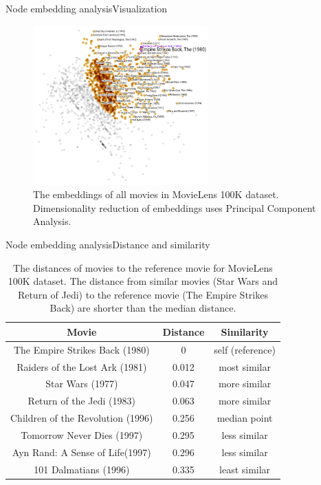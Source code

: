 \documentclass{beamer}
\begin{document}
\begin{frame}{Node embedding analysis}{Visualization}
	\begin{figure}[!ht]\centering
		\includegraphics[width=0.6\textwidth]{movies-annotation}
		\caption{
			The embeddings of all movies in MovieLens 100K dataset. Dimensionality reduction of embeddings uses Principal Component Analysis.
		}
		\label{fig:movies}
	\end{figure}
\end{frame}

\begin{frame}{Node embedding analysis}{Distance and similarity}
	\begin{table}[H]\centering
		\caption{
			The distances of movies to the reference movie for MovieLens 100K dataset. The distance from similar movies (Star Wars and Return of Jedi) to the reference movie (The Empire Strikes Back) are shorter than the median distance.
		}
		\begin{tabular}{|c|c|c|} \hline
			\textbf{Movie} & \textbf{Distance} & \textbf{Similarity} \\ \hline
			The Empire Strikes Back (1980) & 0 & self (reference) \\ \hline
			Raiders of the Lost Ark (1981) & 0.012 & most similar \\ \hline
			Star Wars (1977) & 0.047 & more similar \\ \hline
			Return of the Jedi (1983) & 0.063 & more similar \\ \hline
			Children of the Revolution (1996) & 0.256 & median point \\ \hline
			Tomorrow Never Dies (1997) & 0.295 & less similar \\ \hline
			Ayn Rand: A Sense of Life(1997) & 0.296 & less similar \\ \hline
			101 Dalmatians (1996) & 0.335 & least similar \\ \hline
		\end{tabular}
		\label{tab:movielens100k-distance}
	\end{table}
\end{frame}
\end{document}
